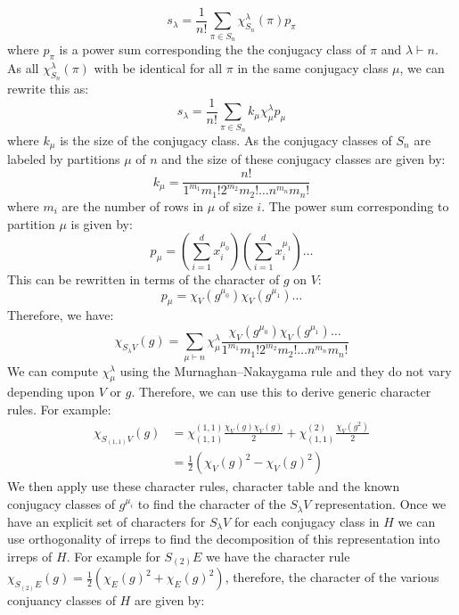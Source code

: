 \documentclass{article}
\begin{document}
\begin{equation}
    s_{\lambda} = \frac{1}{n!}\sum_{\pi \in S_n} \chi^{\lambda}_{S_n}(\pi) p_{\pi}
\end{equation}
where $p_{\pi}$ is a power sum corresponding the the conjugacy class of $\pi$ and $\lambda \vdash n$. As all $\chi^{\lambda}_{S_n}(\pi)$ with be identical for all $\pi$ in the same conjugacy class $\mu$, we can rewrite this as:
\begin{equation}
        s_{\lambda} = \frac{1}{n!}\sum_{\pi \in S_n} k_{\mu}\chi^{\lambda}_\mu p_{\mu}
\end{equation}
where $k_{\mu}$ is the size of the conjugacy class. As the conjugacy classes of $S_n$ are labeled by partitions $\mu$ of $n$ and the size of these conjugacy classes are given by:
\begin{equation}
    k_{\mu} = \frac{n!}{1^{m_1}m_1!2^{m_2}m_2!\ldots n^{m_n}m_n!}
\end{equation}
where $m_i$ are the number of rows in $\mu$ of size $i$. The power sum corresponding to partition $\mu$ is given by:
\begin{equation}
    p_{\mu} = \left(\sum_{i=1}^dx_i^{\mu_0}\right)\left(\sum_{i=1}^dx_i^{\mu_1}\right)\ldots
\end{equation}
This can be rewritten in terms of the character of $g$ on $V$:
\begin{equation}
     p_{\mu} = \chi_V(g^{\mu_0})\chi_V(g^{\mu_1})\ldots
\end{equation}
Therefore, we have:
\begin{equation}
    \chi_{S_{\lambda}V}(g) = \sum_{\mu \vdash n} \chi_{\mu}^{\lambda}\frac{ \chi_V(g^{\mu_0})\chi_V(g^{\mu_1})\ldots}{1^{m_1}m_1!2^{m_2}m_2!\ldots n^{m_n}m_n!}
\end{equation}
We can compute $\chi_{\mu}^{\lambda}$ using the Murnaghan–Nakaygama rule and they do not vary depending upon $V$ or $g$. Therefore, we can use this to derive generic character rules. For example:
\begin{align}
    \chi_{S_{(1,1)}V}(g) &= \chi_{(1,1)}^{(1,1)}\frac{\chi_V(g)\chi_V(g)}{2} + \chi_{(1,1)}^{(2)}\frac{\chi_V(g^2)}{2}\\
    &= \frac{1}{2}(\chi_V(g)^2 - \chi_V(g)^2)
\end{align}
We then apply use these character rules, character table and the known conjugacy classes of $g^{\mu_i}$ to find the character of the $S_{\lambda}V$ representation. Once we have an explicit set of characters for $S_{\lambda}V$ for each conjugacy class in $H$ we can use orthogonality of irreps to find the decomposition of this representation into irreps of $H$. For example for $S_{(2)}E$ we have the character rule $\chi_{S_{(2)}E}(g)= \frac{1}{2}(\chi_E(g)^2 + \chi_E(g)^2)$, therefore, the character of the various conjuancy classes of $H$ are given by:
\end{document}
